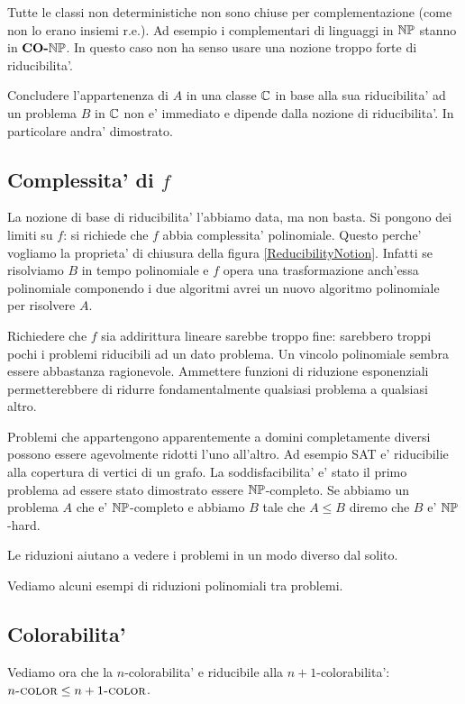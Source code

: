 Tutte le classi non deterministiche non sono chiuse per complementazione (come non lo erano insiemi
r.e.). Ad esempio i complementari di linguaggi in $\mathbb{NP}$ stanno in $\textbf{CO-}\mathbb{NP}$. In questo caso
non ha senso usare una nozione troppo forte di riducibilita'.

Concludere l'appartenenza di $A$ in una classe $\mathbb{C}$ in base alla sua riducibilita' ad un
problema $B$ in $\mathbb{C}$ non e' immediato e dipende dalla nozione di riducibilita'. In particolare
andra' dimostrato.

\subsection{Complessita' di $f$}

La nozione di base di riducibilita' l'abbiamo data, ma non basta. Si pongono dei limiti su $f$: si
richiede che $f$ abbia complessita' polinomiale. Questo perche' vogliamo la proprieta' di chiusura
della figura \ref{ReducibilityNotion}. Infatti se risolviamo $B$ in tempo polinomiale e $f$ opera
una trasformazione anch'essa polinomiale componendo i due algoritmi avrei un nuovo algoritmo
polinomiale per risolvere $A$.

Richiedere che $f$ sia addirittura lineare sarebbe troppo fine: sarebbero troppi pochi i problemi
riducibili ad un dato problema. Un vincolo polinomiale sembra essere abbastanza ragionevole.
Ammettere funzioni di riduzione esponenziali permetterebbere di ridurre fondamentalmente qualsiasi
problema a qualsiasi altro.

Problemi che appartengono apparentemente a domini completamente diversi possono essere agevolmente
ridotti l'uno all'altro. Ad esempio SAT e' riducibilie alla copertura di vertici di un grafo. La
soddisfacibilita' e' stato il primo problema ad essere stato dimostrato essere $\mathbb{NP}$-completo. Se
abbiamo un problema $A$ che e' $\mathbb{NP}$-completo e abbiamo $B$ tale che $A \leq B$ diremo che $B$
e' $\mathbb{NP}$-hard.

Le riduzioni aiutano a vedere i problemi in un modo diverso dal solito.

Vediamo alcuni esempi di riduzioni polinomiali tra problemi.

\subsection{Colorabilita'}

Vediamo ora che la $n$-colorabilita' e riducibile alla $n+1$-colorabilita': $n\textsc{-color} \leq
n+1\textsc{-color}$.

